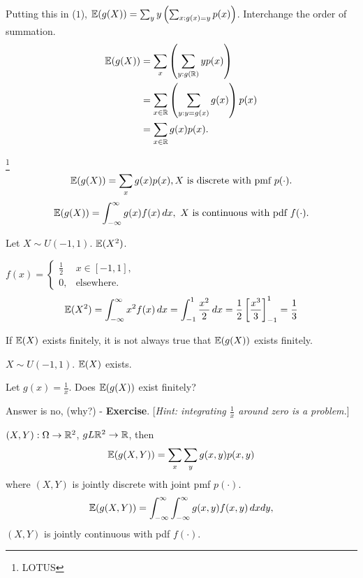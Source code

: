 \documentclass[10pt, a4paper]{article}
\begin{document}
Putting this in ($1$),
$\mathbb{E}(g(X)) = \sum_{y}y\left(\sum_{x : g(x) = y}p(x)\right)$.
Interchange the order of summation.
\begin{align*}
    \mathbb{E}(g(X)) &= \sum_{x}\left(\sum_{y : g(\mathbb{R})}yp(x)\right) \\
    &= \sum_{x \in \mathbb{R}}\left(\sum_{y : y = g(x)}g(x)\right)p(x) \\
    &= \sum_{x \in \mathbb{R}}g(x)p(x).
\end{align*}
\begin{theorem}\footnote{LOTUS}
    \[
    \mathbb{E}(g(X)) = \sum_{x}g(x)p(x), \text{$X$ is discrete with pmf $p(\cdot)$}.
    \]
    \[
    \mathbb{E}(g(X)) = \int_{-\infty}^{\infty}g(x)f(x)\,dx,\text{ $X$ is continuous with pdf $f(\cdot)$}.
    \]
\end{theorem}

\begin{example}
    Let $X \sim U(-1, 1)$.
    $\mathbb{E}(X ^ 2)$.

    $f(x) = \begin{cases}
        \frac{1}{2} & x \in [-1, 1], \\
        0, &\text{elsewhere}.
    \end{cases}$
    \[
    \mathbb{E}(X ^ 2) = \int_{-\infty}^{\infty}x ^ 2f(x)\,dx = \int_{-1}^{1}\frac{x ^ 2}{2}\,dx = \frac{1}{2}\left[\frac{x ^ 3}{3}\right]_{-1}^{1} = \frac{1}{3}
    \]
\end{example}
\begin{remark}
    If $\mathbb{E}(X)$ exists finitely,
    it is not always true that $\mathbb{E}(g(X))$ exists finitely.
\end{remark}

\begin{example}
    $X \sim U(-1, 1)$.
    $\mathbb{E}(X)$ exists.

    Let $g(x) = \frac{1}{x}$.
    Does $\mathbb{E}(g(X))$ exist finitely?

    Answer is no,
    (why?) - \textbf{Exercise}.
    [\textit{Hint: integrating $\frac{1}{x}$ around zero is a problem.}]
\end{example}

\begin{theorem}
    $(X, Y) : \Omega \rightarrow \mathbb{R} ^ 2$, $g L \mathbb{R} ^ 2 \rightarrow \mathbb{R}$,
    then
    \[
    \mathbb{E}(g(X, Y)) = \sum_{x}\sum_{y}g(x, y)p(x, y)
    \]
    where $(X, Y)$ is jointly discrete with joint pmf $p(\cdot)$.
    \[
    \mathbb{E}(g(X, Y)) = \int_{-\infty}^{\infty}\int_{-\infty}^{\infty}g(x, y)f(x, y)\,dxdy,
    \]
    $(X, Y)$ is jointly continuous with pdf $f(\cdot)$.
\end{theorem}
\end{document}
